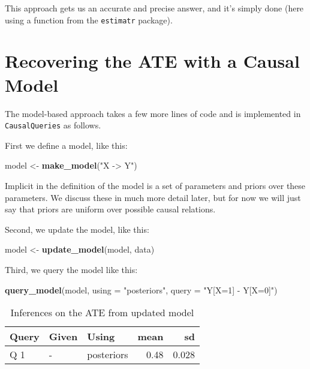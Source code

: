 \documentclass[
  12pt,
]{book}
\newenvironment{Shaded}{\begin{snugshade}}{\end{snugshade}}
\newcommand{\DataTypeTok}[1]{\textcolor[rgb]{0.13,0.29,0.53}{#1}}
\newcommand{\KeywordTok}[1]{\textcolor[rgb]{0.13,0.29,0.53}{\textbf{#1}}}
\newcommand{\NormalTok}[1]{#1}
\newcommand{\StringTok}[1]{\textcolor[rgb]{0.31,0.60,0.02}{#1}}
\begin{document}
This approach gets us an accurate and precise answer, and it's simply done (here using a function from the \texttt{estimatr} package).

\hypertarget{recovering-the-ate-with-a-causal-model}{%
\section{Recovering the ATE with a Causal Model}\label{recovering-the-ate-with-a-causal-model}}

The model-based approach takes a few more lines of code and is implemented in \texttt{CausalQueries} as follows.

First we define a model, like this:

\begin{Shaded}
\begin{Highlighting}[]
\NormalTok{model <-}\StringTok{ }\KeywordTok{make_model}\NormalTok{(}\StringTok{"X -> Y"}\NormalTok{)}
\end{Highlighting}
\end{Shaded}

Implicit in the definition of the model is a set of parameters and priors over these parameters. We discuss these in much more detail later, but for now we will just say that priors are uniform over possible causal relations.

Second, we update the model, like this:

\begin{Shaded}
\begin{Highlighting}[]
\NormalTok{model <-}\StringTok{ }\KeywordTok{update_model}\NormalTok{(model, data) }
\end{Highlighting}
\end{Shaded}

Third, we query the model like this:

\begin{Shaded}
\begin{Highlighting}[]
\KeywordTok{query_model}\NormalTok{(model, }\DataTypeTok{using  =} \StringTok{"posteriors"}\NormalTok{, }\DataTypeTok{query =} \StringTok{"Y[X=1] - Y[X=0]"}\NormalTok{) }
\end{Highlighting}
\end{Shaded}

\begin{table}

\caption{\label{tab:unnamed-chunk-9}Inferences on the ATE from updated model}
\centering
\begin{tabular}[t]{l|l|l|r|r}
\hline
Query & Given & Using & mean & sd\\
\hline
Q 1 & - & posteriors & 0.48 & 0.028\\
\hline
\end{tabular}
\end{table}
\end{document}
